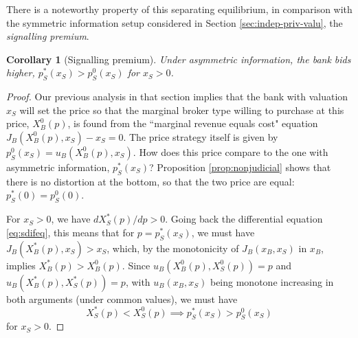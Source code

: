 \documentclass[11pt,twopage]{article}
\newtheorem{remark}{Remark}
{\bf}{\it}
\newtheorem{corollary}{Corollary}
{\bf}{\it}
\begin{document}

There is a noteworthy property of this separating equilibrium, in
comparison with the symmetric information setup considered in Section
\ref{sec:indep-priv-valu}, the \emph{signalling premium}.
\begin{corollary}[Signalling premium]\label{cor:sp}
  Under asymmetric information, the bank bids higher, $p_S^*(x_S) >
  p_S^0(x_S)$ for $x_S>0$.
\end{corollary}

\begin{proof} Our previous analysis in that section implies that the
  bank with valuation $x_S$ will set the price so that the marginal
  broker type willing to purchase at this price, $X_B^0(p)$, is found
  from the ``marginal revenue equals cost" equation
  $J_B(X_B^0(p),x_S)-x_S=0$. The price strategy itself is given by
  $p_S^0(x_S) = u_B(X_B^0(p),x_S)$. How does this price compare to the
  one with asymmetric information, $p_S^*(x_S)$? Proposition
  \ref{prop:nonjudicial} shows that there is no distortion at the
  bottom, so that the two price are equal: $p_S^*(0) = p_S^0(0)$.

  For $x_S>0$, we have $d X_S^*(p)/dp>0$. Going back the differential
  equation \eqref{eq:sdifeq}, this means that for $p=p_S^*(x_S)$, we
  must have $J_B(X_B^*(p),x_S)>x_S$, which, by the monotonicity of
  $J_B(x_B,x_S)$ in $x_B$, implies $ X_B^*(p)>X_B^0(p)$. Since
  $u_B(X_B^0(p),X_S^0(p)) = p$ and $u_B(X_B^*(p),X_S^*(p)) = p$, with
  $u_B(x_B,x_S)$ being monotone increasing in both arguments (under
  common values), we must have \[ X_S^*(p)<X_S^0(p) \implies
  p_S^*(x_S) > p_S^0(x_S)\] for $x_S>0$. \end{proof}
\end{document}
